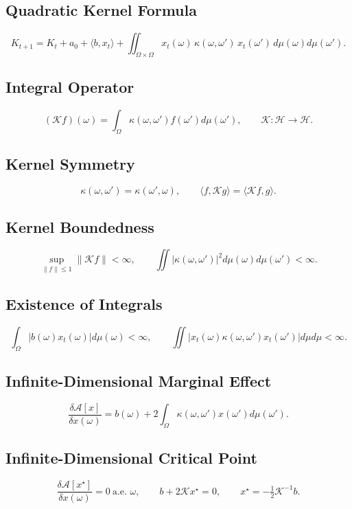 \documentclass[11pt]{article}
\begin{document}
\subsection{Quadratic Kernel Formula}
\[
K_{t+1}=K_t+a_0+\langle b,x_t\rangle+\iint_{\Omega\times\Omega}x_t(\omega)\,\kappa(\omega,\omega')\,x_t(\omega')\,d\mu(\omega)d\mu(\omega').
\]

\subsection{Integral Operator}
\[
(\mathcal{K}f)(\omega)=\int_\Omega \kappa(\omega,\omega')f(\omega')d\mu(\omega'),
\qquad \mathcal{K}:\mathcal{H}\to\mathcal{H}.
\]

\subsection{Kernel Symmetry}
\[
\kappa(\omega,\omega')=\kappa(\omega',\omega),
\qquad \langle f,\mathcal{K}g\rangle=\langle \mathcal{K}f,g\rangle.
\]

\subsection{Kernel Boundedness}
\[
\sup_{\|f\|\le 1}\|\mathcal{K}f\|<\infty,
\qquad \iint |\kappa(\omega,\omega')|^2d\mu(\omega)d\mu(\omega')<\infty.
\]

\subsection{Existence of Integrals}
\[
\int_\Omega |b(\omega)x_t(\omega)|d\mu(\omega)<\infty,
\qquad \iint|x_t(\omega)\kappa(\omega,\omega')x_t(\omega')|d\mu d\mu<\infty.
\]

\subsection{Infinite-Dimensional Marginal Effect}
\[
\frac{\delta\mathcal{A}[x]}{\delta x(\omega)}=b(\omega)+2\int_\Omega \kappa(\omega,\omega')x(\omega')d\mu(\omega').
\]

\subsection{Infinite-Dimensional Critical Point}
\[
\frac{\delta\mathcal{A}[x^{\star}]}{\delta x(\omega)}=0\ \text{a.e. }\omega,
\qquad b+2\mathcal{K}x^{\star}=0,
\qquad x^{\star}=-\tfrac12\mathcal{K}^{-1}b.
\]
\end{document}
